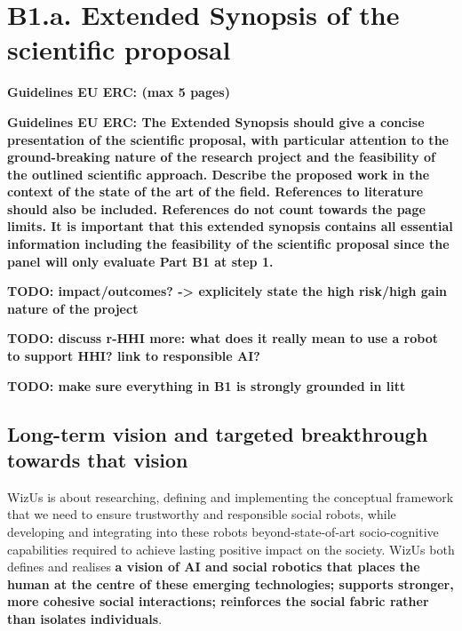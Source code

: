 \documentclass[11pt]{report}
\newcommand{\project}{WizUs\xspace}
\newcommand{\TODO}[1]{{\color{red}\textbf{TODO: #1}}}
\newcommand{\eu}[1]{{\color{teal}\textbf{Guidelines EU ERC: #1}}}
\begin{document}
\newcommand{\wpThree}{Social situation assessment}
\newcommand{\wpThreeShort}{\wpThree{}}

\newcommand{\wpFour}{Data-driven social behaviour generation}
\newcommand{\wpFourShort}{Social behaviours}

\newcommand{\wpFive}{Evidence-based research: demonstrable usefulness of social robots in
real-world, complex scenarios}
\newcommand{\wpFiveShort}{Experimental investigation}







\newrefsection

\chapter{B1.a. Extended Synopsis of the scientific proposal}\label{part1}
\eu{(max 5 pages)}

\eu{The Extended Synopsis should give a concise presentation of the scientific
proposal, with particular attention to the ground-breaking nature of the
research project and the feasibility of the outlined scientific approach.
Describe the proposed work in the context of the state of the art of the field.
References to literature should also be included. References do not count
towards the page limits. It is important that this extended synopsis contains
all essential information including the feasibility of the scientific proposal
since the panel will only evaluate Part B1 at step 1.}

\TODO{impact/outcomes? -> explicitely state the high risk/high gain nature of
the project}

\TODO{discuss r-HHI more: what does it really mean to use a robot to support
HHI? link to responsible AI?}

\TODO{make sure everything in B1 is strongly grounded in litt}

\section{Long-term vision and targeted breakthrough towards that vision}

\project is about researching, defining and implementing the conceptual
framework that we need to ensure trustworthy and responsible social robots,
while developing and integrating into these robots beyond-state-of-art
socio-cognitive capabilities required to achieve lasting positive impact on the
society. \project both defines and realises \textbf{a vision of AI and social
robotics that places the human at the centre of these emerging technologies;
supports stronger, more cohesive social interactions; reinforces the social
fabric rather than isolates individuals}.
\end{document}
